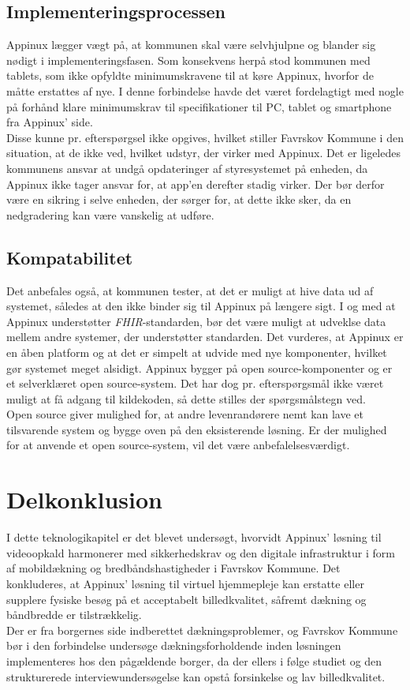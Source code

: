 \subsection{Implementeringsprocessen}
\label{sec:implementeringsprocessen}
Appinux lægger vægt på, at kommunen skal være selvhjulpne og blander sig nødigt i implementeringsfasen. Som konsekvens herpå stod kommunen med tablets, som ikke opfyldte minimumskravene til at køre Appinux, hvorfor de måtte erstattes af nye. I denne forbindelse havde det været fordelagtigt med nogle på forhånd klare minimumskrav til specifikationer til PC, tablet og smartphone fra Appinux' side.\\Disse kunne pr. efterspørgsel ikke opgives, hvilket stiller Favrskov Kommune i den situation, at de ikke ved, hvilket udstyr, der virker med Appinux. Det er ligeledes kommunens ansvar at undgå opdateringer af styresystemet på enheden, da Appinux ikke tager ansvar for, at app'en derefter stadig virker. Der bør derfor være en sikring i selve enheden, der sørger for, at dette ikke sker, da en nedgradering kan være vanskelig at udføre.
\subsection{Kompatabilitet}
Det anbefales også, at kommunen tester, at det er muligt at hive data ud af systemet, således at den ikke binder sig til Appinux på længere sigt. I og med at Appinux understøtter \textit{FHIR}-standarden, bør det være muligt at udveklse data mellem andre systemer, der understøtter standarden. Det vurderes, at Appinux er en åben platform og at det er simpelt at udvide med nye komponenter, hvilket gør systemet meget alsidigt. Appinux bygger på open source-komponenter og er et selverklæret open source-system. Det har dog pr. efterspørgsmål ikke været muligt at få adgang til kildekoden, så dette stilles der spørgsmålstegn ved.\\Open source giver mulighed for, at andre levenrandørere nemt kan lave et tilsvarende system og bygge oven på den eksisterende løsning. Er der mulighed for at anvende et open source-system, vil det være anbefalelsesværdigt.

\section{Delkonklusion}
I dette teknologikapitel er det blevet undersøgt, hvorvidt Appinux’ løsning til videoopkald harmonerer med sikkerhedskrav og den digitale infrastruktur i form af mobildækning og bredbåndshastigheder i Favrskov Kommune.
Det konkluderes, at Appinux’ løsning til virtuel hjemmepleje kan erstatte eller supplere fysiske besøg på et acceptabelt billedkvalitet, såfremt dækning og båndbredde er tilstrækkelig.
\\Der er fra borgernes side indberettet dækningsproblemer, og Favrskov Kommune bør i den forbindelse undersøge dækningsforholdende inden løsningen implementeres hos den pågældende borger, da der ellers i følge studiet  og den strukturerede interviewundersøgelse kan opstå forsinkelse og lav billedkvalitet.

